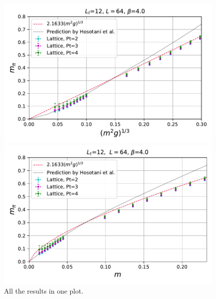 \documentclass[11pt]{article}
\begin{document}
\begin{figure}[H]
\centering
\includegraphics[width=0.7 \textwidth]{Images/Mpi64x12FiniteTAllPt.pdf}

\includegraphics[width=0.7 \textwidth]{Images/MpivsM64x12FiniteTAllPt.pdf}

\caption{All the results in one plot.}
\end{figure}
\end{document}
